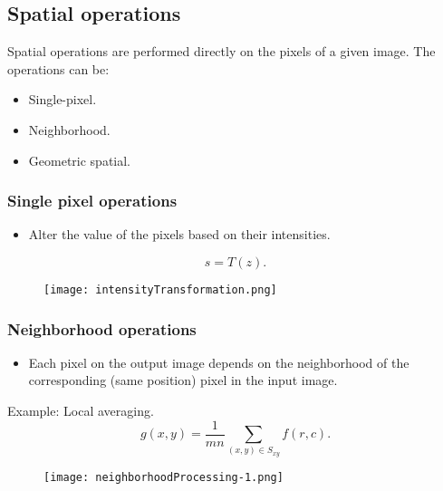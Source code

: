 
\subsection{Spatial operations}


\begin{frame}
Spatial operations are performed directly on the pixels of a given image. The operations can be:
\begin{itemize}
\item Single-pixel.
\item Neighborhood.
\item Geometric spatial.
\end{itemize}
\end{frame}


\begin{frame}
\frametitle{Single pixel operations}
\begin{itemize}
\item Alter the value of the pixels based on their intensities.
\end{itemize}
\begin{equation}
s = T(z).
\end{equation}
\begin{figure}
\centering
\texttt{[image: intensityTransformation.png]}
\end{figure}
\end{frame}


\begin{frame}
\frametitle{Neighborhood operations}
\begin{itemize}
\item Each pixel on the output image depends on the neighborhood of the corresponding (same position) pixel in the input image.
\end{itemize}
Example: Local averaging.
\begin{equation}
g(x,y) = \dfrac{1}{mn}\sum_{(x,y)\in S_{xy}}f(r,c).
\end{equation}
\begin{figure}
\centering
\texttt{[image: neighborhoodProcessing-1.png]}
\end{figure}
\end{frame}

